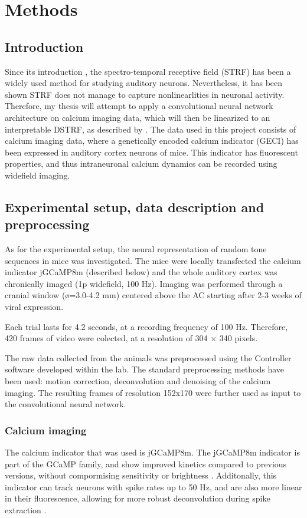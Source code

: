\chapter{Methods}\label{methods}

\section{Introduction}
Since its introduction \parencite{aertsenSpectrotemporalReceptiveFields1980a}, the spectro-temporal receptive field (STRF) has been a widely used method for studying auditory neurons. Nevertheless, it has been shown STRF does not manage to capture nonlinearlities in neuronal activity. Therefore, my thesis will attempt to apply a convolutional neural network architecture on calcium imaging data, which will then be linearized to an interpretable DSTRF, as described by \textcite{keshishianEstimatingInterpretingNonlinear2020}. 
The data used in this project consists of calcium imaging data, where a genetically encoded calcium indicator (GECI) has been expressed in auditory cortex neurons of mice. This indicator has fluorescent properties, and thus intraneuronal calcium dynamics can be recorded using widefield imaging.

\section{Experimental setup, data description and preprocessing}
As for the experimental setup, the neural representation of random tone sequences in mice  was investigated. The mice were locally transfected the calcium indicator jGCaMP8m (described below) and the whole auditory cortex was chronically imaged (1p widefield, 100 Hz). Imaging was performed through a cranial window (ø=3.0-4.2 mm) centered above the AC starting after 2-3 weeks of viral expression.

Each trial lasts for 4.2 seconds, at a recording frequency of 100 Hz. Therefore, 420 frames of video were colected, at a resolution of 304 $\times$ 340 pixels.

The raw data collected from the animals was preprocessed using the Controller software developed within the lab. The standard preprocessing methods have been used: motion correction, deconvolution and denoising of the calcium imaging. The resulting frames of resolution 152x170 were further used as input to the convolutional neural network.

\subsection{Calcium imaging}
The calcium indicator that was used is jGCaMP8m. The jGCaMP8m indicator is part of the GCaMP family, and show improved kinetics compared to previous versions, without compormising sensitivity or brightness \parencite{zhangFastSensitiveGCaMP2023}. Additonally, this indicator can track neurons with spike rates up to 50 Hz, and are also more linear in their fluorescence, allowing for more robust deconvolution during spike extraction \parencite{zhangFastSensitiveGCaMP2023}.

